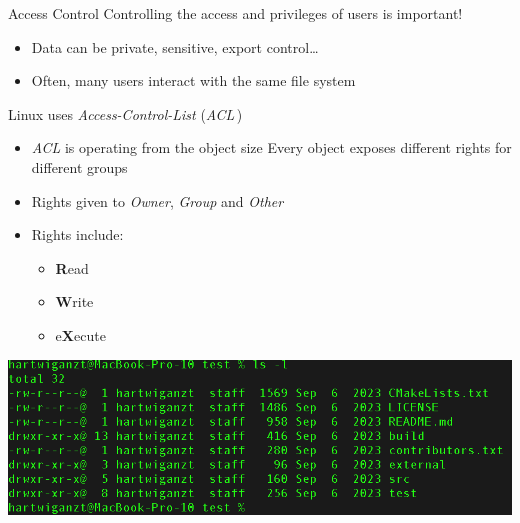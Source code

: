 \documentclass{setbeamer}
\begin{document}
\begin{frame}{Access Control}
    Controlling the access and privileges of users is important!
    
    \begin{itemize}
        \item Data can be private, sensitive, export control\dots
        \item Often, many users interact with the same file system
    \end{itemize}

    \pause
    \vspace{0.3cm}

       Linux uses \emph{Access-Control-List} (\emph{ACL}\,)
    \begin{itemize}
        \item \emph{ACL} is operating from the object size {\Large \MVRightarrow} Every object exposes different rights for different groups
        \item Rights given to \emph{Owner}, \emph{Group} and \emph{Other}
        \item Rights include:
        \begin{itemize}
            \item \textbf{R}ead 
            \item \textbf{W}rite
            \item e\textbf{X}ecute
        \end{itemize}
    \end{itemize}

    \pause
    \vspace{-1.5cm}
    \hspace{5cm}
	\includegraphics[width=.6\columnwidth]{resources/ls-l.png}

\end{frame}
\end{document}
